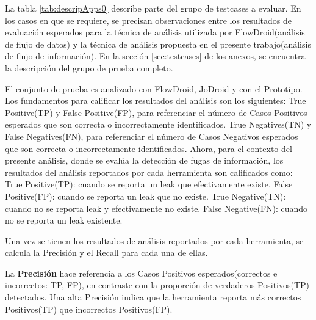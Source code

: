 La tabla \ref{tab:descripApps0} describe parte del grupo de testcases a
evaluar. En los casos en que se requiere, se precisan observaciones entre los
resultados de evaluación esperados para la técnica de análisis utilizada por
FlowDroid(análisis de flujo de datos) y la técnica de análisis propuesta en el
presente trabajo(análisis de flujo de información).
En la sección \ref{sec:testcases} de los anexos, se encuentra la
descripción del grupo de prueba completo.

El conjunto de prueba es analizado con FlowDroid, JoDroid y con el
Prototipo.\newline 
Los fundamentos\cite{Precision-Recall} para calificar los resultados del
análisis son los siguientes:\newline 
True Positive(TP) y False Positive(FP), para referenciar el número de Casos
Positivos esperados que son correcta o incorrectamente identificados.\newline 
True Negatives(TN) y False Negatives(FN), para referenciar el número de 
Casos Negativos esperados que son correcta o incorrectamente
identificados.\newline
Ahora, para el contexto del presente análisis, donde se evalúa la detección de
fugas de información, los resultados del análisis reportados por cada
herramienta son calificados como:\newline 
True Positive(TP): cuando se reporta un leak que efectivamente existe.\newline
False Positive(FP): cuando se reporta un leak que no existe.\newline 
True Negative(TN): cuando no se reporta leak y efectivamente no existe.\newline
False Negative(FN): cuando no se reporta un leak existente. 

Una vez se tienen los resultados de análisis reportados por cada herramienta, se
calcula la Precisión y el Recall para cada una de ellas.

La \textbf{Precisión} hace referencia a los Casos Positivos esperados(correctos
e incorrectos: TP, FP), en contraste con la proporción de verdaderos Positivos(TP)
detectados\cite{Precision-Recall}. Una alta Precisión indica que la herramienta
reporta más correctos Positivos(TP) que incorrectos Positivos(FP). 

